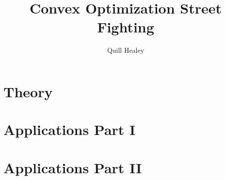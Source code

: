 \documentclass[12pt,reqno]{report}
\title{Convex Optimization Street Fighting}
\author{Quill Healey}
\theoremstyle{definition}
\numberwithin{equation}{section}
\begin{document}
\maketitle



\part{Theory}






\part{Applications Part I}











\part{Applications Part II}




\end{document}
